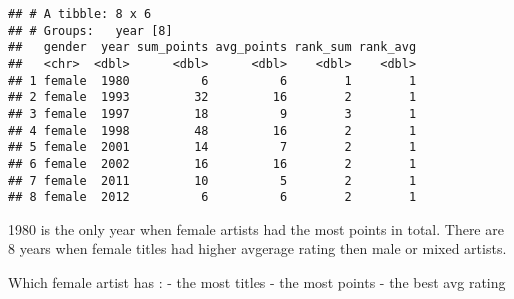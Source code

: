 \documentclass[
]{article}
\newenvironment{Shaded}{\begin{snugshade}}{\end{snugshade}}
\newcommand{\DataTypeTok}[1]{\textcolor[rgb]{0.13,0.29,0.53}{#1}}
\newcommand{\KeywordTok}[1]{\textcolor[rgb]{0.13,0.29,0.53}{\textbf{#1}}}
\newcommand{\NormalTok}[1]{#1}
\newcommand{\OperatorTok}[1]{\textcolor[rgb]{0.81,0.36,0.00}{\textbf{#1}}}
\newcommand{\StringTok}[1]{\textcolor[rgb]{0.31,0.60,0.02}{#1}}
\begin{document}
\begin{verbatim}
## # A tibble: 8 x 6
## # Groups:   year [8]
##   gender  year sum_points avg_points rank_sum rank_avg
##   <chr>  <dbl>      <dbl>      <dbl>    <dbl>    <dbl>
## 1 female  1980          6          6        1        1
## 2 female  1993         32         16        2        1
## 3 female  1997         18          9        3        1
## 4 female  1998         48         16        2        1
## 5 female  2001         14          7        2        1
## 6 female  2002         16         16        2        1
## 7 female  2011         10          5        2        1
## 8 female  2012          6          6        2        1
\end{verbatim}

1980 is the only year when female artists had the most points in total.
There are 8 years when female titles had higher avgerage rating then
male or mixed artists.

Which female artist has : - the most titles - the most points - the best
avg rating

\begin{Shaded}
\end{Shaded}
\end{document}
